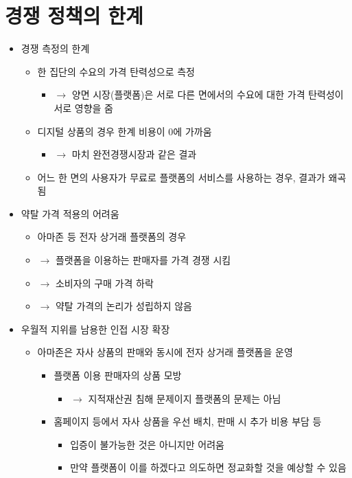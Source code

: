 \section{경쟁 정책의 한계}\label{sec:}
\begin{itemize}
\item 경쟁 측정의 한계 \citep{Evans:2013vp,Jenny:2015wh}
	\begin{itemize}
	\item 한 집단의 수요의 가격 탄력성으로 측정 
		\begin{itemize}
		\item $\rightarrow$ 양면 시장(플랫폼)은 서로 다른 면에서의 수요에 대한 가격 탄력성이 서로 영향을 줌
		\end{itemize}
	\item 디지털 상품의 경우 한계 비용이 0에 가까움 
		\begin{itemize}
		\item $\rightarrow$ 마치 완전경쟁시장과 같은 결과
		\end{itemize}
	\item 어느 한 면의 사용자가 무료로 플랫폼의 서비스를 사용하는 경우, 결과가 왜곡됨
	\end{itemize}
\item 약탈 가격 적용의 어려움
	\begin{itemize}
	\item 아마존 등 전자 상거래 플랫폼의 경우 
	\item $\rightarrow$ 플랫폼을 이용하는 판매자를 가격 경쟁 시킴 
	\item $\rightarrow$ 소비자의 구매 가격 하락 
	\item $\rightarrow$ 약탈 가격의 논리가 성립하지 않음
	\end{itemize}
\item 우월적 지위를 남용한 인접 시장 확장	
	\begin{itemize}
	\item 아마존은 자사 상품의 판매와 동시에 전자 상거래 플랫폼을 운영
		\begin{itemize}
		\item 플랫폼 이용 판매자의 상품 모방 
			\begin{itemize}
			\item $\rightarrow$ 지적재산권 침해 문제이지 플랫폼의 문제는 아님
			\end{itemize}
		\item 홈페이지 등에서 자사 상품을 우선 배치, 판매 시 추가 비용 부담 등
			\begin{itemize}
			\item 입증이 불가능한 것은 아니지만 어려움
			\item 만약 플랫폼이 이를 하겠다고 의도하면 정교화할 것을 예상할 수 있음
			\end{itemize}
		\end{itemize}
	\end{itemize}
\end{itemize}

